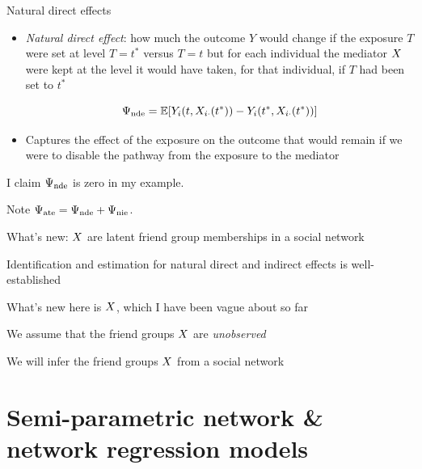 \documentclass{beamer}
\theoremstyle{remark}
\begin{document}
\begin{frame}{Natural direct effects}

    \begin{itemize}
        \item \emph{Natural direct effect}: how much the outcome $Y$ would change if the exposure $T$ were set at level $T = t^*$ versus $T = t$ but for each individual the mediator $X$ were kept at the level it would have taken, for that individual, if $T$ had been set to $t^*$

              \begin{equation*}
                  \nde = \E{Y_i (t, \X_{i \cdot}(t^*)) - Y_i (t^*, \X_{i \cdot} (t^*))}
              \end{equation*}

        \item Captures the effect of the exposure on the outcome that would remain if we were to disable the pathway from the exposure to the mediator

    \end{itemize}

    I claim $\Psi_\mathrm{nde}$ is zero in my example.

    Note $\Psi_\mathrm{ate} = \Psi_\mathrm{nde} + \Psi_\mathrm{nie}$.

\end{frame}

\begin{frame}{What's new: $X$ are latent friend group memberships in a social network}

    Identification and estimation for natural direct and indirect effects is well-established

    What's new here is $X$, which I have been vague about so far

    We assume that the friend groups $X$ are \emph{unobserved}

    We will infer the friend groups $X$ from a social network

\end{frame}

\section{Semi-parametric network \& network regression models}
\end{document}
